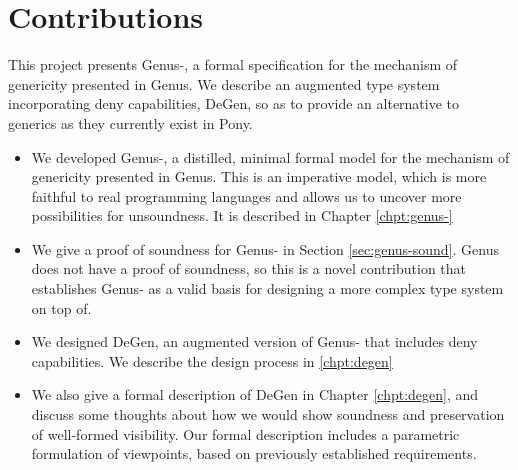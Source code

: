 \section{Contributions}

This project presents Genus-, a formal specification for the mechanism of genericity presented in Genus. We describe an augmented type system incorporating deny capabilities, DeGen, so as to provide an alternative to generics as they currently exist in Pony.

\begin{itemize}
    \item We developed Genus-, a distilled, minimal formal model for the mechanism of genericity presented in Genus. This is an imperative model, which is more faithful to real programming languages and allows us to uncover more possibilities for unsoundness. It is described in Chapter \ref{chpt:genus-}
    
    \item We give a proof of soundness for Genus- in Section \ref{sec:genus-sound}. Genus does not have a proof of soundness, so this is a novel contribution that establishes Genus- as a valid basis for designing a more complex type system on top of.
    
    \item We designed DeGen, an augmented version of Genus- that includes deny capabilities. We describe the design process in \ref{chpt:degen} 
    
    \item We also give a formal description of DeGen in Chapter \ref{chpt:degen}, and discuss some thoughts about how we would show soundness and preservation of well-formed visibility. Our formal description includes a parametric formulation of viewpoints, based on previously established requirements.
\end{itemize}